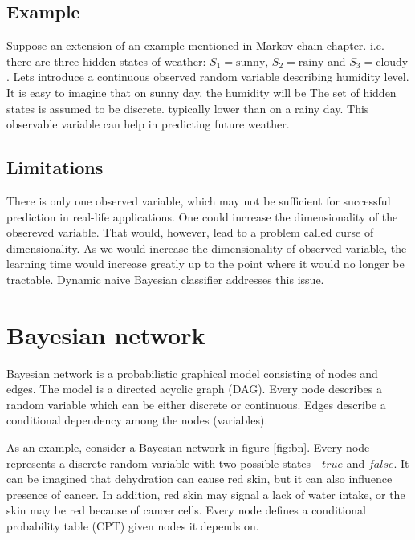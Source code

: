\documentclass[thesis=B,english]{FITthesis}[2012/06/26]
\begin{document}
\subsection{Example}
Suppose an extension of an example mentioned in Markov chain chapter. i.e. there are three hidden states of weather: $S_1 = \text{sunny}$, $S_2 = \text{rainy}$ and $S_3 = \text{cloudy}$. Lets introduce a continuous observed random variable describing humidity level. It is easy to imagine that on sunny day, the humidity will be The set of hidden states is assumed to be discrete.
typically lower than on a rainy day. This observable variable can help in predicting future weather.

\subsection{Limitations}
There is only one observed variable, which may not be sufficient for successful prediction in real-life applications. One could increase the dimensionality of the obsereved variable. That would, however, lead to a problem called curse of dimensionality. As we would increase the dimensionality of observed variable, the learning time would increase greatly up to the point where it would no longer be tractable. Dynamic naive Bayesian classifier addresses this issue.

\section{Bayesian network}

Bayesian network is a probabilistic graphical model consisting of nodes and edges. The model is a directed acyclic graph (DAG). Every node describes a random variable which can be either discrete or continuous. Edges describe a conditional dependency among the nodes (variables).

As an example, consider a Bayesian network in figure \ref{fig:bn}. Every node represents a discrete random variable with two possible states - $true$ and $false$. It can be imagined that dehydration can cause red skin, but it can also influence presence of cancer. In addition, red skin may signal a lack of water intake, or the skin may be red because of cancer cells. Every node defines a conditional probability table (CPT) given nodes it depends on.
\end{document}
